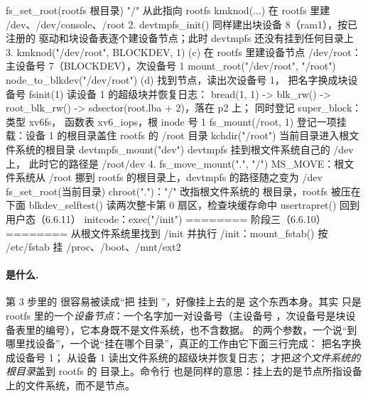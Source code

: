 \begin{txtcode}
       fs_set_root(rootfs 根目录)      "/" 从此指向 rootfs
       kmknod(...)                     在 rootfs 里建 /dev、/dev/console、/root
    2. devtmpfs_init()                 同样建出块设备 8（ram1），按已注册的
                                       驱动和块设备表逐个建设备节点；此时
                                       devtmpfs 还没有挂到任何目录上
    3. kmknod("/dev/root", BLOCKDEV, 1)
                                  (c)  在 rootfs 里建设备节点 /dev/root：
                                       主设备号 7（BLOCKDEV），次设备号 1
       mount_root("/dev/root", "/root")
         node_to_blkdev("/dev/root")
                                  (d)  找到节点，读出次设备号 1，
                                       把名字换成块设备号
         fsinit(1)                     读设备 1 的超级块并恢复日志：
                                       bread(1, 1) -> blk_rw() -> root_blk_rw()
                                       -> sdsector(root.lba + 2)，落在 p2 上；
                                       同时登记 super_block：类型 xv6fs，
                                       函数表 xv6_iops，根 inode 号 1
         fs_mount(/root, 1)            登记一项挂载：设备 1 的根目录盖住
                                       rootfs 的 /root 目录
       kchdir("/root")                 当前目录进入根文件系统的根目录
       devtmpfs_mount("dev")           devtmpfs 挂到根文件系统自己的 /dev 上，
                                       此时它的路径是 /root/dev
    4. fs_move_mount(".", "/")         MS_MOVE：根文件系统从 /root 挪到 rootfs
                                       的根目录上，devtmpfs 的路径随之变为 /dev
       fs_set_root(当前目录)           chroot(".")："/" 改指根文件系统的
                                       根目录，rootfs 被压在下面
  blkdev_selftest()                    读两次整卡第 0 扇区，检查块缓存命中
  usertrapret()                        回到用户态（6.6.11）
initcode：exec("/init")                ======== 阶段三（6.6.10）========
                                       从根文件系统里找到 /init 并执行
  /init：mount_fstab()                 按 /etc/fstab 挂 /proc、/boot、/mnt/ext2
\end{txtcode}

\paragraph{ 是什么.} 第 3 步里的  很容易被读成“把  挂到 ”，好像挂上去的是  这个东西本身。其实  只是 rootfs 里的一个\emph{设备节点}：一个名字加一对设备号（主设备号 ，次设备号是块设备表里的编号），它本身既不是文件系统，也不含数据。 的两个参数，一个说“到哪里找设备”，一个说“挂在哪个目录”，真正的工作由它下面三行完成： 把名字换成设备号 1； 从设备 1 读出文件系统的超级块并恢复日志； 才把\emph{这个文件系统的根目录}盖到 rootfs 的  目录上。命令行  也是同样的意思：挂上去的是节点所指设备上的文件系统，而不是节点。

